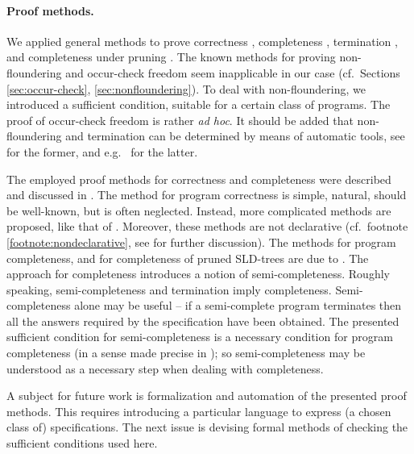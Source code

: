 \documentclass{tlp}
\begin{document}
{\paragraph{Proof methods.}
We applied general methods to prove correctness  \cite{Clark79},
completeness \cite{drabent.tocl16}, termination \cite{DBLP:journals/jlp/Bezem93},
and completeness under pruning  \cite{drabent.tocl16}.
The known methods for proving non-floundering and occur-check freedom seem
inapplicable in our case
(cf.\ Sections \ref{sec:occur-check}, \ref{sec:nonfloundering}).
To deal with non-floundering,
we introduced a sufficient condition, suitable for a certain class of programs.
The proof of occur-check freedom is rather {\em ad hoc}.
It should be added that non-floundering and termination can be
determined by means of automatic tools, see
\cite{king.non-suspension2008} for the former,
and e.g.\ \cite[and the references therein]{NguyenSGS11-termination-shorter} 
for the latter.
{\sloppy\par}




The employed proof methods for correctness and completeness were described
and discussed in \cite{drabent.tocl16}.
The method for program correctness  \cite{Clark79} is simple, natural,
  should be well-known, but is often neglected.
  Instead, more complicated methods are proposed, like that of
  \cite{Apt-Prolog}. 
  Moreover, these methods are not declarative
  (cf.\ footnote \ref{footnote:nondeclarative}, see
  \cite{DBLP:journals/tplp/DrabentM05shorter,drabent.tocl16}
  for further discussion).
The methods for program completeness, and 
for completeness of pruned SLD-trees are due to \cite{drabent.tocl16}.
  The approach for completeness introduces a notion of semi-completeness.
  Roughly speaking, semi-completeness and termination imply completeness.
Semi-completeness alone may be useful -- if a semi-complete program
terminates then all the answers required by the
  specification have been obtained.
  The presented sufficient condition for semi-completeness
  is a necessary condition for program completeness
  (in a sense made precise in  \cite{drabent.tocl16});
  so semi-completeness may be understood as a necessary step when dealing
  with completeness.


A subject for future work is formalization and automation of the presented
proof methods.  This requires introducing a particular language to
express (a chosen class of) specifications.  The next issue is devising
formal methods of checking the sufficient conditions used here.


}
\end{document}
